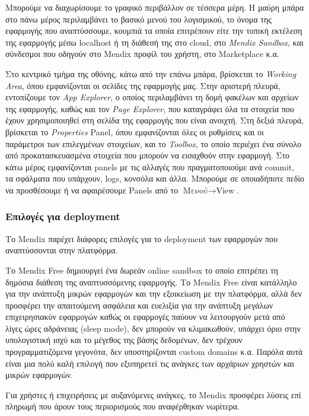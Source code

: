         Μπορούμε να διαχωρίσουμε το γραφικό περιβάλλον σε τέσσερα μέρη. Η μαύρη μπάρα στο πάνω μέρος περιλαμβάνει το βασικό μενού του λογισμικού, το όνομα της εφαρμογής που αναπτύσσουμε, κουμπιά τα οποία επιτρέπουν είτε την τοπική εκτέλεση της εφαρμογής μέσω localhost ή τη διάθεσή της στο cloud, στο \textit{Mendix Sandbox}, και σύνδεσμοι που οδηγούν στο Mendix προφίλ του χρήστη, στο Marketplace κ.α.

        Στο κεντρικό τμήμα της οθόνης, κάτω από την επάνω μπάρα, βρίσκεται το \textit{Working Area}, όπου εμφανίζονται οι σελίδες της εφαρμογής μας. Στην αριστερή πλευρά, εντοπίζουμε τον \textit{App Explorer}, ο οποίος περιλαμβάνει τη δομή φακέλων και αρχείων της εφαρμογής, καθώς και τον \textit{Page Explorer}, που καταγράφει όλα τα στοιχεία που έχουν χρησιμοποιηθεί στη σελίδα της εφαρμογής που είναι ανοιχτή. Στη δεξιά πλευρά, βρίσκεται το \textit{Properties} Panel, όπου εμφανίζονται όλες οι ρυθμίσεις και οι παράμετροι των επιλεγμένων στοιχείων, και το \textit{Toolbox}, το οποίο περιέχει ένα σύνολο από προκατασκευασμένα στοιχεία που μπορούν να εισαχθούν στην εφαρμογή. Στο κάτω μέρος εμφανίζονται panels με τις αλλαγές που πραγματοποιούμε ανά commit, τα σφάλματα που υπάρχουν, logs, κονσόλα και άλλα. Μπορούμε σε οποιαδήποτε πεδίο να προσθέσουμε ή να αφαιρέσουμε Panels από το $ \text{Μενού} \rightarrow \text{View} $. \cite{mendixDoc}

        \subsubsection{Επιλογές για deployment} \label{sec:MendixDeployment}
            Το Mendix παρέχει διάφορες επιλογές για το deployment των εφαρμογών που αναπτύσσονται στην πλατφόρμα.

            Το Mendix Free δημιουργεί ένα δωρεάν online sandbox το οποίο επιτρέπει τη δημόσια διάθεση της αναπτυσσόμενης εφαρμογής. Το Mendix Free είναι κατάλληλο για την ανάπτυξη μικρών εφαρμογών και την εξοικείωση με την πλατφόρμα, αλλά δεν προσφέρει την απαιτούμενη ασφάλεια και ευελιξία για την ανάπτυξη μεγάλων επιχειρησιακύν εφαρμογών καθώς οι εφαρμογές παύουν να λειτουργούν μετά από λίγες ώρες αδράνειας (sleep mode), δεν μπορούν να κλιμακωθούν, υπάρχει όριο στην υπολογιστική ισχύ και το μέγεθος της βάσης δεδομένων, δεν τρέχουν προγραμματιζόμενα γεγονότα, δεν υποστηρίζονται custom domains κ.α. Παρόλα αυτά είναι μια πολύ καλή επιλογή που εξυπηρετεί τις ανάγκες των αρχάριων χρηστών και μικρών εφαρμογών. \cite{mendixCloud}

            Για χρήστες ή επιχειρήσεις με αυξανόμενες ανάγκες, το Mendix προσφέρει λύσεις επί πληρωμή που άρουν τους περιορισμούς που αναφέρθηκαν νωρίτερα.


